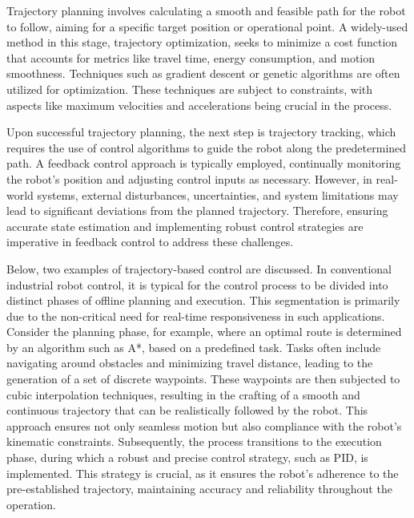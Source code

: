 Trajectory planning\cite{gasparetto2015path}\cite{gasparetto2012trajectory} involves calculating a smooth and feasible path for the robot to follow, aiming for a specific target position or operational point. A widely-used method in this stage, trajectory optimization\cite{betts1998survey}, seeks to minimize a cost function that accounts for metrics like travel time, energy consumption, and motion smoothness. Techniques such as gradient descent or genetic algorithms are often utilized for optimization. These techniques are subject to constraints, with aspects like maximum velocities and accelerations being crucial in the process.

Upon successful trajectory planning, the next step is trajectory tracking, which requires the use of control algorithms to guide the robot along the predetermined path. A feedback control approach is typically employed, continually monitoring the robot's position and adjusting control inputs as necessary. However, in real-world systems, external disturbances, uncertainties, and system limitations may lead to significant deviations from the planned trajectory. Therefore, ensuring accurate state estimation and implementing robust control strategies are imperative in feedback control to address these challenges.

Below, two examples of trajectory-based control are discussed. In conventional industrial robot control\cite{gasparetto2010optimal}, it is typical for the control process to be divided into distinct phases of offline planning and execution. This segmentation is primarily due to the non-critical need for real-time responsiveness in such applications. Consider the planning phase, for example, where an optimal route is determined by an algorithm such as A*, based on a predefined task. Tasks often include navigating around obstacles and minimizing travel distance, leading to the generation of a set of discrete waypoints\cite{cui2011based}. These waypoints are then subjected to cubic interpolation techniques\cite{bickley1968piecewise}, resulting in the crafting of a smooth and continuous trajectory that can be realistically followed by the robot. This approach ensures not only seamless motion but also compliance with the robot's kinematic constraints. Subsequently, the process transitions to the execution phase, during which a robust and precise control strategy, such as PID, is implemented. This strategy is crucial, as it ensures the robot's adherence to the pre-established trajectory, maintaining accuracy and reliability throughout the operation\cite{lynch2017modern}.

